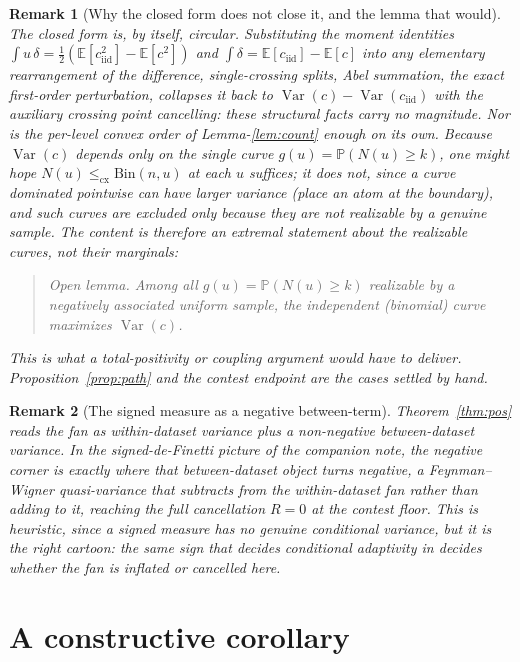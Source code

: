 \documentclass[11pt]{article}
\newtheorem{remark}{Remark}
\begin{document}
\begin{remark}[Why the closed form does not close it, and the lemma that would]
The closed form is, by itself, circular. Substituting the moment identities
$\int u\,\delta=\tfrac12(\mathbb E[c_{\mathrm{iid}}^2]-\mathbb E[c^2])$ and
$\int\delta=\mathbb E[c_{\mathrm{iid}}]-\mathbb E[c]$ into any elementary rearrangement of the
difference, single-crossing splits, Abel summation, the exact first-order perturbation, collapses it
back to $\operatorname{Var}(c)-\operatorname{Var}(c_{\mathrm{iid}})$ with the auxiliary crossing
point cancelling: these structural facts carry no magnitude. Nor is the per-level convex order of
Lemma-\ref{lem:count} enough on its own. Because $\operatorname{Var}(c)$ depends only on the single
curve $g(u)=\mathbb P(N(u)\ge k)$, one might hope $N(u)\le_{\mathrm{cx}}\mathrm{Bin}(n,u)$ at each
$u$ suffices; it does not, since a curve dominated pointwise can have larger variance (place an atom
at the boundary), and such curves are excluded only because they are not realizable by a genuine
sample. The content is therefore an extremal statement about the realizable curves, not their
marginals:
\begin{quote}
\emph{Open lemma.} Among all $g(u)=\mathbb P(N(u)\ge k)$ realizable by a negatively associated uniform
sample, the independent (binomial) curve maximizes $\operatorname{Var}(c)$.
\end{quote}
This is what a total-positivity or coupling argument would have to deliver. Proposition~\ref{prop:path}
and the contest endpoint are the cases settled by hand.
\end{remark}

\begin{remark}[The signed measure as a negative between-term]
Theorem~\ref{thm:pos} reads the fan as within-dataset variance plus a non-negative between-dataset
variance. In the signed-de-Finetti picture of the companion note, the negative corner is exactly
where that between-dataset object turns negative, a Feynman--Wigner quasi-variance that subtracts from
the within-dataset fan rather than adding to it, reaching the full cancellation $R=0$ at the contest
floor. This is heuristic, since a signed measure has no genuine conditional variance, but it is the
right cartoon: the same sign that decides conditional adaptivity in \citet{cotton_signed} decides
whether the fan is inflated or cancelled here.
\end{remark}

\section{A constructive corollary}
\end{document}
